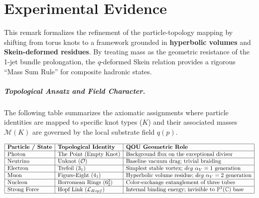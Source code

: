 \chapter{Experimental Evidence}


\begin{remark}
\label{rem:skein-decomposition}
This remark formalizes the refinement of the particle-topology mapping by shifting from torus knots to a framework grounded in \textbf{hyperbolic volumes} and \textbf{Skein-deformed residues}. By treating mass as the geometric resistance of the 1-jet bundle prolongation, the $q$-deformed Skein relation provides a rigorous ``Mass Sum Rule'' for composite hadronic states.

\paragraph{Topological Ansatz and Field Character.}
The following table summarizes the axiomatic assignments where particle identities are mapped to specific knot types ($K$) and their associated masses $\mathcal{M}(K)$ are governed by the local substrate field $q(p)$.

$$
\begin{array}{|l|l|l|}
\hline
\textbf{Particle / State} & \textbf{Topological Identity} & \textbf{QOU Geometric Role} \\ \hline
\text{Photon} & \text{The Point (Empty Knot)} & \text{Background flux on the exceptional divisor} \\ \hline
\text{Neutrino} & \text{Unknot } (\mathcal{O}) & \text{Baseline vacuum drag; trivial braiding} \\ \hline
\text{Electron} & \text{Trefoil } (3_1) & \text{Simplest stable vortex; } deg~\alpha_V = 1 \text{ generation} \\ \hline
\text{Muon} & \text{Figure-Eight } (4_1) & \text{Hyperbolic volume residue; } deg~\alpha_V = 2 \text{ generation} \\ \hline
\text{Nucleon} & \text{Borromean Rings } (6_2^3) & \text{Color-exchange entanglement of three tubes} \\ \hline
\text{Strong Force} & \text{Hopf Link } (\mathcal{L}_{Hopf}) & \text{Internal binding energy; invisible to } \mathbb{P}^1(\mathbb{C}) \text{ base} \\ \hline
\end{array}
$$





\end{remark}

